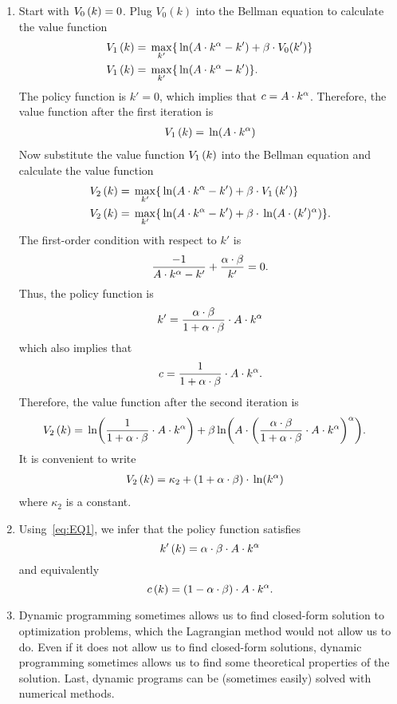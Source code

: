 \documentclass[letterpaper,12pt,leqno]{article}
\begin{document}
\begin{enumerate}
\item Start with $V_{0}\left( k \right) =0$. Plug $V_{0}(k)$ into the Bellman equation to calculate the value function
\begin{align*}
V_{1}\bp{k}& =\max[k']{\ln{A\cdot k^{\a}-k'} +\b\cdot  V_{0}(k')}\\
V_{1}\bp{k} &=\max[k']{\ln{A\cdot k^{\a}-k'}}.
\end{align*}
The policy function is $k'=0$, which implies that $c=A\cdot k^{\alpha}$. Therefore, the value function after the first iteration is
\begin{align*}
V_{1}\bp{k} =\ln{A\cdot k^{\a}}
\end{align*}
Now substitute the value function $V_{1}\left( k \right) $ into the Bellman equation and calculate the value function
\begin{align*}
V_{2}\bp{k} &=\max[k']{\ln{A\cdot k^{\a}-k'} +\b \cdot V_{1}\bp{k'}}\\
V_{2}\bp{k} &=\max[k']{\ln{A\cdot k^{\a}-k'} +\b \cdot \ln{A\cdot (k')^{\a}}}.
\end{align*}
The first-order condition  with respect to $k'$ is 
\begin{align*}
\frac{-1}{A \cdot k^{\alpha}-k'}+\frac{\alpha \cdot \beta}{k'}=0.
\end{align*}
Thus, the policy function is
\begin{align*}
k'=\frac{\alpha\cdot \beta}{1+\alpha  \cdot \beta} \cdot A \cdot k^{\alpha}
\end{align*}
which also implies that 
\begin{align*}
c= \frac{1}{1+\alpha\cdot \beta}\cdot A\cdot k^{\alpha}.
\end{align*}
Therefore, the value function after the second iteration is
\begin{align*}
V_{2}\bp{k} &=\ln{\frac{1}{1+\a \cdot\b}\cdot A\cdot k^{\a}} +\b \ln{A\cdot \bp{\frac{\a \cdot \b}{1+\a\cdot  \b}\cdot A\cdot k^{\a}} ^{\a}}.
\end{align*}
It is convenient to write 
\begin{align*}
V_{2}\bp{k} &=\kappa_{2}+\bp{1+\a\cdot  \b}\cdot  \ln{k^{\a}}
\end{align*}
where $\kappa_{2}$ is a constant.
\item Using~\eqref{eq:EQ1}, we infer that the policy function satisfies
\[k'\left( k \right) =\alpha\cdot \beta\cdot  A\cdot k^{\alpha}\]
and equivalently
\[c\left( k \right) =\left( 1-\alpha\cdot \beta \right)\cdot  A\cdot k^{\alpha}.\]

\item Dynamic programming sometimes allows us to find closed-form solution to optimization problems, which the Lagrangian method would not allow us to do. Even if it does not allow us to find closed-form solutions, dynamic programming sometimes allows us to find some theoretical properties of the solution. Last, dynamic programs can be (sometimes easily) solved with numerical methods.
\end{enumerate}
\end{document}
